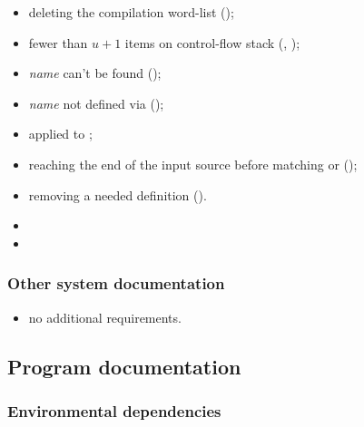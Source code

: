 \begin{itemize}
\item deleting the compilation word-list ();
\item fewer than $u+1$ items on control-flow stack
	(,
	 );
\item \emph{name} can't be found ();
\item \emph{name} not defined via 
	();
\item {} applied to ;
\item reaching the end of the input source before matching
	 or 
	();
\item removing a needed definition ().
\item {}
\item {}
\end{itemize}

\subsubsection{Other system documentation} %

\begin{itemize}
\item no additional requirements.
\end{itemize}

\subsection{Program documentation} %

\subsubsection{Environmental dependencies} %

